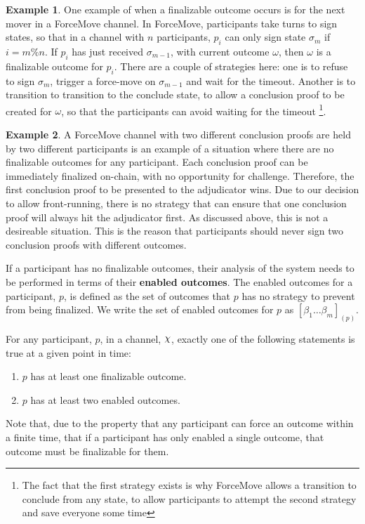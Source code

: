 \documentclass{article}
\DeclareRobustCommand{\rchi}{{\mathpalette\irchi\relax}}
\newcommand{\irchi}[2]{\raisebox{\depth}{$#1\chi$}} %
\theoremstyle{definition}
\newtheorem{example}{Example}[section]
\newcommand{\enf}[1]{[#1]}
\begin{document}
\begin{example}
One example of when a finalizable outcome occurs is for the next mover in a ForceMove channel.
In ForceMove, participants take turns to sign states, so that in a channel with $n$ participants,
$p_i$ can only sign state $\sigma_m$ if $i = m \% n$.
If $p_i$ has just received $\sigma_{m-1}$, with current outcome $\omega$, then $\omega$
is a finalizable outcome for $p_i$.
There are a couple of strategies here: one is to refuse to sign $\sigma_m$, trigger a force-move
on $\sigma_{m-1}$ and wait for the timeout. 
Another is to transition to transition to the conclude state, to allow a conclusion proof
to be created for $\omega$, so that the participants can avoid waiting for the timeout
\footnote{The fact that the first strategy exists is why ForceMove allows a transition to
conclude from any state, to allow participants to attempt the second strategy and save everyone some time}.
\end{example}

\begin{example}
A ForceMove channel with two different conclusion proofs are held by two different participants
is an example of a situation where there are no finalizable outcomes for any participant.
Each conclusion proof can be immediately finalized on-chain, with no opportunity for challenge.
Therefore, the first conclusion proof to be presented to the adjudicator wins. 
Due to our decision to allow front-running, there is no strategy that can ensure that one
conclusion proof will always hit the adjudicator first.
As discussed above, this is not a desireable situation.
This is the reason that participants should never sign two conclusion proofs
with different outcomes.
\end{example}

If a participant has no finalizable outcomes, their analysis of the system needs to be performed
in terms of their \textbf{enabled outcomes}.
The enabled outcomes for a participant, $p$, is defined as the set of outcomes that $p$ has
no strategy to prevent from being finalized.
We write the set of enabled outcomes for $p$ as $\enf{\beta_1 \dots \beta_m}_{(p)}$.

For any participant, $p$, in a channel, $\rchi$, exactly one of the following statements is
true at a given point in time:
\begin{enumerate}
  \item $p$ has at least one finalizable outcome.
  \item $p$ has at least two enabled outcomes.
\end{enumerate}
Note that, due to the property that any participant can force an outcome within a finite time,
that if a participant has only enabled a single outcome, that outcome must be finalizable for them.
\end{document}
